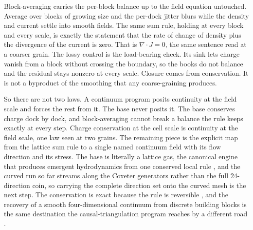 Block-averaging carries the per-block balance up to the field equation
untouched. Average over blocks of growing size and the per-dock jitter blurs
while the density and current settle into smooth fields. The same sum rule,
holding at every block and every scale, is exactly the statement that the rate
of change of density plus the divergence of the current is zero. That is
$\nabla\!\cdot J = 0$, the same sentence read at a coarser grain. The lossy
control is the load-bearing check. Its sink lets charge vanish from a block
without crossing the boundary, so the books do not balance and the residual stays
nonzero at every scale. Closure comes from conservation. It is not a byproduct
of the smoothing that any coarse-graining produces.

So there are not two laws. A continuum program posits continuity at the field
scale and forces the rest from it. The base never posits it. The base conserves
charge dock by dock, and block-averaging cannot break a balance the rule keeps
exactly at every step. Charge conservation at the cell scale is continuity at
the field scale, one law seen at two grains. The remaining piece is the
explicit map from the lattice sum rule to a single named continuum field with
its flow direction and its stress. The base is literally a lattice gas, the
canonical engine that produces emergent hydrodynamics from one conserved local
rule \cite{frisch1986, dhumieres1986}, and the curved run so far streams along
the Coxeter generators rather than the full 24-direction coin, so carrying the
complete direction set onto the curved mesh is the next step. The conservation
is exact because the rule is reversible \cite{kari2005, fredkin1982}, and the
recovery of a smooth four-dimensional continuum from discrete building blocks is
the same destination the causal-triangulation program reaches by a different
road \cite{ambjorn2004, cluesurf2026repo}.
